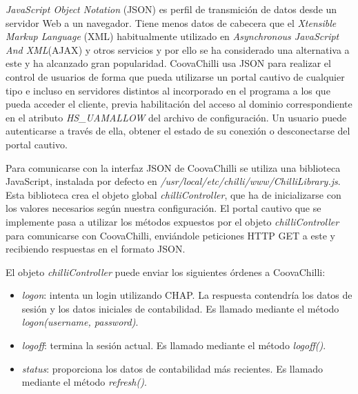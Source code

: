 \emph{JavaScript Object Notation} (JSON) es perfil de transmición de datos desde un servidor Web a un navegador. Tiene menos datos de cabecera que el \emph{Xtensible Markup Language} (\acrshort{XML}) habitualmente utilizado en \emph{Asynchronous JavaScript And XML}(\acrshort{AJAX}) y otros servicios y por ello se ha considerado una alternativa a este y ha alcanzado gran popularidad. CoovaChilli usa JSON para realizar el control de usuarios de forma que pueda utilizarse un portal cautivo de cualquier tipo e incluso en servidores distintos al incorporado en el programa a los que pueda acceder el cliente, previa habilitación del acceso al dominio correspondiente en el atributo \emph{HS\_UAMALLOW} del archivo de configuración. Un usuario puede autenticarse a través de ella, obtener el estado de su conexión o desconectarse del portal cautivo.

Para comunicarse con la interfaz JSON de CoovaChilli se utiliza una biblioteca JavaScript, instalada por defecto en \emph{/usr/local/etc/chilli/www/ChilliLibrary.js}. Esta biblioteca crea el objeto global \emph{chilliController}, que ha de inicializarse con los valores necesarios según nuestra configuración. El portal cautivo que se implemente pasa a utilizar los métodos expuestos por el objeto \emph{chilliController} para comunicarse con CoovaChilli, enviándole peticiones HTTP GET a este y recibiendo respuestas en el formato JSON.

El objeto \emph{chilliController} puede enviar los siguientes órdenes a CoovaChilli:

\begin{itemize}
\item \emph{logon}: intenta un login utilizando CHAP. La respuesta contendría los datos de sesión y los datos iniciales de contabilidad. Es llamado mediante el método \emph{logon(username, password)}.
\item \emph{logoff}: termina la sesión actual. Es llamado mediante el método \emph{logoff()}.
\item \emph{status}: proporciona los datos de contabilidad más recientes. Es llamado mediante el método \emph{refresh()}.
\end{itemize}


